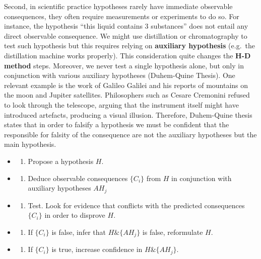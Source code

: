 \documentclass[
]{book}
\providecommand{\tightlist}{%
  \setlength{\itemsep}{0pt}\setlength{\parskip}{0pt}}
\begin{document}
Second, in scientific practice hypotheses rarely have immediate observable consequences, they often require measurements or experiments to do so. For instance, the hypothesis ``this liquid contains 3 substances'' does not entail any direct observable consequence. We might use distillation or chromatography to test such hypothesis but this requires relying on \textbf{auxiliary hypothesis} (e.g.~the distillation machine works properly). This consideration quite changes the \textbf{H-D method} steps. Moreover, we never test a single hypothesis alone, but only in conjunction with various auxiliary hypotheses (Duhem-Quine Thesis). One relevant example is the work of Galileo Galilei and his reports of mountains on the moon and Jupiter satellites. Philosophers such as Cesare Cremonini refused to look through the telescope, arguing that the instrument itself might have introduced artefacts, producing a visual illusion. Therefore, Duhem-Quine thesis states that in order to falsify a hypothesis we must be confident that the responsible for falsity of the consequence are not the auxiliary hypotheses but the main hypothesis.

\begin{itemize}
\item
  \begin{enumerate}
  \def\labelenumi{\arabic{enumi}.}
  \tightlist
  \item
    Propose a hypothesis \(H\).
  \end{enumerate}
\item
  \begin{enumerate}
  \def\labelenumi{\arabic{enumi}.}
  \setcounter{enumi}{1}
  \tightlist
  \item
    Deduce observable consequences \(\{C_i\}\) from \(H\) in conjunction with auxiliary hypotheses \({AH_j}\)
  \end{enumerate}
\item
  \begin{enumerate}
  \def\labelenumi{\arabic{enumi}.}
  \setcounter{enumi}{2}
  \tightlist
  \item
    Test. Look for evidence that conflicts with the predicted consequences \(\{C_i\}\) in order to disprove \(H\).
  \end{enumerate}
\item
  \begin{enumerate}
  \def\labelenumi{\arabic{enumi}.}
  \setcounter{enumi}{3}
  \tightlist
  \item
    If \(\{C_i\}\) is false, infer that \(H \& \{AH_j\}\) is false, reformulate \(H\).
  \end{enumerate}
\item
  \begin{enumerate}
  \def\labelenumi{\arabic{enumi}.}
  \setcounter{enumi}{4}
  \tightlist
  \item
    If \(\{C_i\}\) is true, increase confidence in \(H \& \{AH_j\}\).
  \end{enumerate}
\end{itemize}
\end{document}
